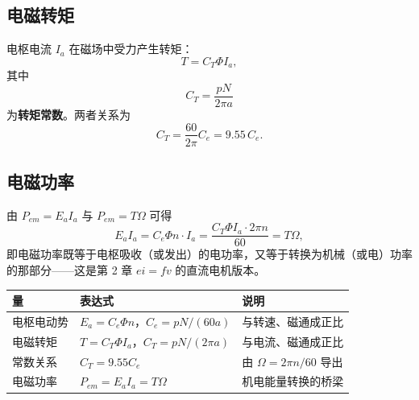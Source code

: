 
\subsection{电磁转矩}
电枢电流 $I_a$ 在磁场中受力产生转矩：
\begin{equation}
T=C_T\Phi I_a,
\end{equation}
其中
\begin{equation}
C_T=\frac{pN}{2\pi a}
\end{equation}
为\textbf{转矩常数}。两者关系为
\begin{equation}
C_T=\frac{60}{2\pi}C_e=9.55\,C_e .
\end{equation}


\subsection{电磁功率}
由 $P_{em}=E_aI_a$ 与 $P_{em}=T\Omega$ 可得
\begin{equation}
E_aI_a=C_e\Phi n\cdot I_a=\frac{C_T\Phi I_a\cdot2\pi n}{60}=T\Omega ,
\end{equation}
即电磁功率既等于电枢吸收（或发出）的电功率，又等于转换为机械（或电）功率的那部分——这是第 2 章 $ei=fv$ 的直流电机版本。

\begin{center}
\begin{tabular}{@{}lll@{}}
\toprule
量 & 表达式 & 说明 \\
\midrule
电枢电动势 & $E_a=C_e\Phi n$，$C_e=pN/(60a)$ & 与转速、磁通成正比 \\
电磁转矩 & $T=C_T\Phi I_a$，$C_T=pN/(2\pi a)$ & 与电流、磁通成正比 \\
常数关系 & $C_T=9.55C_e$ & 由 $\Omega=2\pi n/60$ 导出 \\
电磁功率 & $P_{em}=E_aI_a=T\Omega$ & 机电能量转换的桥梁 \\
\bottomrule
\end{tabular}
\end{center}

